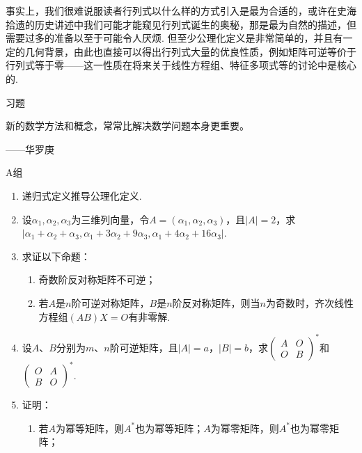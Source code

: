 事实上，我们很难说服读者行列式以什么样的方式引入是最为合适的，或许在史海拾遗的历史讲述中我们可能才能窥见行列式诞生的奥秘，那是最为自然的描述，但需要过多的准备以至于可能令人厌烦. 但至少公理化定义是非常简单的，并且有一定的几何背景，由此也直接可以得出行列式大量的优良性质，例如矩阵可逆等价于行列式等于零——这一性质在将来关于线性方程组、特征多项式等的讨论中是核心的.

\vspace{2ex}
\centerline{\heiti \Large 习题}

\vspace{2ex}
{\kaishu 新的数学方法和概念，常常比解决数学问题本身更重要。}
\begin{flushright}
    \kaishu
    ——华罗庚
\end{flushright}

\centerline{\heiti A组}
\begin{enumerate}
    \item 递归式定义推导公理化定义.

    \item 设$\alpha_1,\alpha_2,\alpha_3$为三维列向量，令$A=(\alpha_1,\alpha_2,\alpha_3)$，且$|A|=2$，求$|\alpha_1+\alpha_2+\alpha_3,\alpha_1+3\alpha_2+9\alpha_3,\alpha_1+4\alpha_2+16\alpha_3|$.

    \item 求证以下命题：
          \begin{enumerate}
              \item 奇数阶反对称矩阵不可逆；

              \item 若$A$是$n$阶可逆对称矩阵，$B$是$n$阶反对称矩阵，则当$n$为奇数时，齐次线性方程组$(AB)X=O$有非零解.
          \end{enumerate}

    \item 设$A$、$B$分别为$m$、$n$阶可逆矩阵，且$|A|=a$，$|B|=b$，求$\begin{pmatrix}
                  A & O \\ O & B
              \end{pmatrix}^*$和$\begin{pmatrix}
                  O & A \\ B & O
              \end{pmatrix}^*$.

    \item 证明：
          \begin{enumerate}
              \item 若$A$为幂等矩阵，则$A^*$也为幂等矩阵；$A$为幂零矩阵，则$A^*$也为幂零矩阵；


\end{enumerate}
\end{enumerate}
